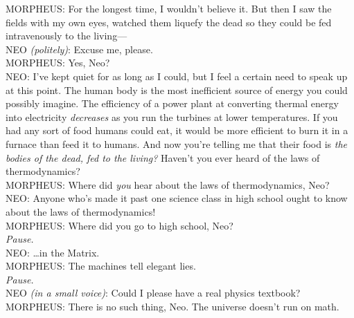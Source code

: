 \begin{playdialog}
MORPHEUS: For the longest time, I wouldn’t believe it. But then I saw the fields with my own eyes, watched them liquefy the dead so they could be fed intravenously to the living—\\

NEO \emph{(politely)}: Excuse me, please.\\

MORPHEUS: Yes, Neo?\\

NEO: I’ve kept quiet for as long as I could, but I feel a certain need to speak up at this point. The human body is the most inefficient source of energy you could possibly imagine. The efficiency of a power plant at converting thermal energy into electricity \emph{decreases} as you run the turbines at lower temperatures. If you had any sort of food humans could eat, it would be more efficient to burn it in a furnace than feed it to humans. And now you’re telling me that their food is \emph{the bodies of the dead, fed to the living?} Haven’t you ever heard of the laws of thermodynamics?\\

MORPHEUS: Where did \emph{you} hear about the laws of thermodynamics, Neo?\\

NEO: Anyone who’s made it past one science class in high school ought to know about the laws of thermodynamics!\\

MORPHEUS: Where did you go to high school, Neo?\\

\emph{Pause.}\\

NEO: …in the Matrix.\\

MORPHEUS: The machines tell elegant lies.\\

\emph{Pause.}\\

NEO \emph{(in a small voice)}: Could I please have a real physics textbook?\\

MORPHEUS: There is no such thing, Neo. The universe doesn’t run on math.\\
\end{playdialog}

